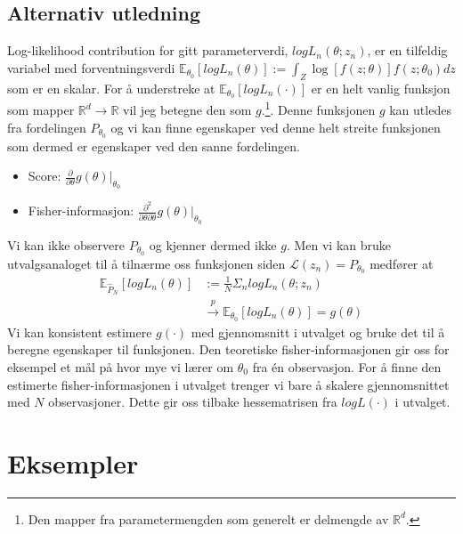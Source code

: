 \subsection{Alternativ utledning}
Log-likelihood contribution for gitt parameterverdi, $logL_n(\theta;z_n)$, er en tilfeldig variabel med forventningsverdi $\mathbb{E}_{\theta_0}[logL_n(\theta)]:=\int_Z \log[f(z;\theta)]f(z;\theta_0)dz$ som er en skalar. For å understreke at $\mathbb{E}_{\theta_0}[logL_n(\cdot)]$ er en helt vanlig funksjon som mapper $\mathbb{R}^d\to\mathbb{R}$ vil jeg betegne den som $g$.\footnote{Den mapper fra parametermengden som generelt er delmengde av $\mathbb{R}^d$.}. Denne funksjonen $g$ kan utledes fra fordelingen $P_{\theta_0}$ og vi kan finne egenskaper ved denne helt streite funksjonen som dermed er egenskaper ved den sanne fordelingen.
\begin{itemize}
\item Score: $\frac{\partial}{\partial \theta}g(\theta)|_{\theta_0}$
\item Fisher-informasjon: $\frac{\partial^2}{\partial \theta \partial \theta}g(\theta)|_{\theta_0}$ 
\end{itemize}
Vi kan ikke observere $P_{\theta_0}$ og kjenner dermed ikke $g$. Men vi kan bruke utvalgsanaloget til å tilnærme oss funksjonen siden $\mathcal{L}(z_n) = P_{\theta_0}$ medfører at
\begin{align}
\mathbb{E}_{\hat{P}_N}[logL_n(\theta)] &:= \frac{1}{N}\Sigma_n logL_n(\theta;z_n) \\
&\overset{p}{\to} \mathbb{E}_{\theta_0}[logL_n(\theta)] = g(\theta)
\end{align}
Vi kan konsistent estimere $g(\cdot)$ med gjennomsnitt i utvalget og bruke det til å beregne egenskaper til funksjonen. Den teoretiske fisher-informasjonen gir oss for eksempel et mål på hvor mye vi lærer om $\theta_0$ fra én observasjon. For å finne den estimerte fisher-informasjonen i utvalget trenger vi bare å skalere gjennomsnittet med $N$ observasjoner. Dette gir oss tilbake hessematrisen fra $logL(\cdot)$ i utvalget.
\section{Eksempler}
